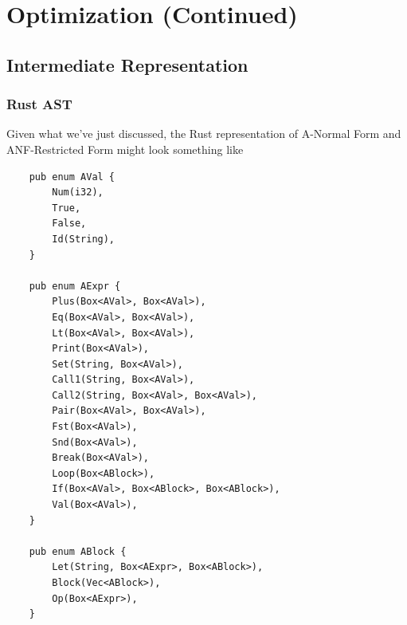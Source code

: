 \documentclass[letterpaper]{article}
\begin{document}
\section{Optimization (Continued)}
\subsection{Intermediate Representation}
\subsubsection{Rust AST}
Given what we've just discussed, the Rust representation of A-Normal Form and ANF-Restricted Form might look something like 
\begin{verbatim}
    pub enum AVal {
        Num(i32),
        True,
        False,
        Id(String),
    }

    pub enum AExpr {
        Plus(Box<AVal>, Box<AVal>),
        Eq(Box<AVal>, Box<AVal>),
        Lt(Box<AVal>, Box<AVal>),
        Print(Box<AVal>),
        Set(String, Box<AVal>),
        Call1(String, Box<AVal>),
        Call2(String, Box<AVal>, Box<AVal>),
        Pair(Box<AVal>, Box<AVal>),
        Fst(Box<AVal>),
        Snd(Box<AVal>),
        Break(Box<AVal>),
        Loop(Box<ABlock>),
        If(Box<AVal>, Box<ABlock>, Box<ABlock>),
        Val(Box<AVal>),
    }

    pub enum ABlock {
        Let(String, Box<AExpr>, Box<ABlock>),
        Block(Vec<ABlock>),
        Op(Box<AExpr>),
    }\end{verbatim}
\end{document}
